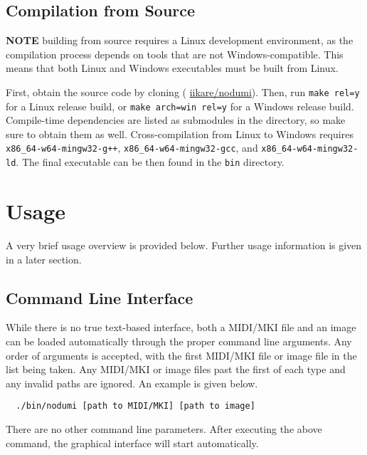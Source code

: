 \documentclass[english]{article}
\providecommand{\mi}[1]{\texttt{#1}}
\begin{document}
\subsection{Compilation from Source}

\textbf{NOTE} \textendash{} building from source requires a Linux development environment, as the compilation process depends on 
tools that are not Windows-compatible. This means that both Linux and Windows executables must be built from Linux.

\vspace{1em}

First, obtain the source code by cloning 
\textcolor{lcol}{(\raisebox{-0.1\height}{\faGithub} \href{https://github.com/iikare/nodumi}{iikare/nodumi})}.
Then, run \mi{make rel=y} for a Linux release build, or \mi{make arch=win rel=y} for a Windows release build.
Compile-time dependencies are listed as submodules in the directory, so make sure to obtain them as well. Cross-compilation
from Linux to Windows requires 
\mi{x86_64-w64-mingw32-g++},
\mi{x86_64-w64-mingw32-gcc}, and
\mi{x86_64-w64-mingw32-ld}. The final executable can be then found in the \mi{bin} directory.

\section{Usage}

A very brief usage overview is provided below. Further usage information is given in a later section.

\subsection{Command Line Interface}

While there is no true text-based interface, both a MIDI/MKI file and an image can be loaded automatically through
the proper command line arguments. Any order of arguments is accepted, with the first MIDI/MKI file or image file in the list
being taken. Any MIDI/MKI or image files past the first of each type and any invalid paths are ignored. An example is given below.

\begin{verbatim}
  ./bin/nodumi [path to MIDI/MKI] [path to image]
\end{verbatim}

There are no other command line parameters. After executing the above command, the graphical interface will start automatically. 
\end{document}
